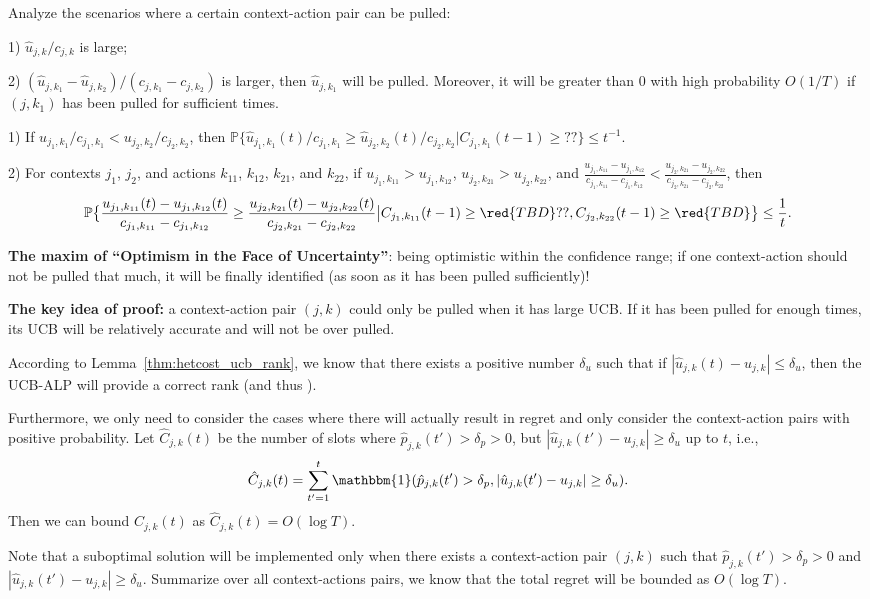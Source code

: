 Analyze the scenarios where a certain context-action pair can be pulled:

1) $\hat{u}_{j,k}/c_{j,k}$ is large;

2) $(\hat{u}_{j,k_1} - \hat{u}_{j,k_2})/(c_{j, k_1} - c_{j, k_2})$ is larger, then $\hat{u}_{j,k_1}$ will be pulled. Moreover, it will be greater than 0 with high probability $O(1/T)$ if $(j,k_1)$ has been pulled for sufficient times.
\begin{lemma} \label{thm:hetcost_ucb_rank}
1) If $u_{j_1,k_1}/c_{j_1,k_1} <  u_{j_2,k_2}/c_{j_2,k_2}$, then $\mathbb{P}\{\hat{u}_{j_1,k_1}(t)/c_{j_1,k_1} \geq   \hat{u}_{j_2,k_2}(t)/c_{j_2,k_2}| C_{j_1, k_1}(t-1) \geq ?? \} \leq t^{-1}$.

2) For contexts $j_1$, $j_2$, and actions $k_{11}$, $k_{12}$, $k_{21}$, and $k_{22}$, if $u_{j_1,k_{11}} > u_{j_1,k_{12}}$, $u_{j_2,k_{21}} > u_{j_2,k_{22}}$, and $\frac{u_{j_1,k_{11}} - u_{j_1,k_{12}}}{c_{j_1,k_{11}} - c_{j_1,k_{12}}} <  \frac{u_{j_2,k_{21}} - u_{j_2,k_{22}}}{c_{j_2,k_{21}} - c_{j_2,k_{22}}}$, then
\begin{equation}
\mathbb{P}\big\{ \frac{u_{j_1,k_{11}}(t) - u_{j_1,k_{12}}(t)}{c_{j_1,k_{11}} - c_{j_1,k_{12}}} \geq  \frac{u_{j_2,k_{21}}(t) - u_{j_2,k_{22}}(t)}{c_{j_2,k_{21}} - c_{j_2,k_{22}}} \big| C_{j_1, k_{11}}(t-1) \geq \red{TBD} ?? , C_{j_2, k_{22}}(t-1) \geq  \red{TBD}\big\} \leq \frac{1}{t}.
\end{equation}
\end{lemma}

\textbf{The maxim of ``Optimism in the Face of Uncertainty''}: being optimistic within the confidence range; if one context-action should not be pulled that much, it will be finally identified (as soon as it has been pulled sufficiently)!

\textbf{The key idea of proof:} a context-action pair $(j,k)$ could only be pulled when it has large UCB. If it has been pulled for enough times, its UCB will be relatively accurate and will not be over pulled.

According to Lemma~\ref{thm:hetcost_ucb_rank}, we know that there exists a positive number $\delta_u$ such that if $|\hat{u}_{j,k}(t) - u_{j,k}| \leq \delta_u$, then the UCB-ALP will provide a correct rank (and thus ). 

Furthermore, we only need to consider the cases where there will actually result in regret and only consider  the context-action pairs with positive probability.
Let $\hat{C}_{j,k}(t)$ be the number of slots where $\hat{p}_{j,k}(t') > \delta_p > 0$, but $|\hat{u}_{j,k}(t') - u_{j,k}| \geq \delta_u$ up to $t$, i.e.,
\begin{equation}
\hat{C}_{j,k}(t) = \sum_{t' = 1}^{t}\mathbbm{1}(\hat{p}_{j,k}(t') > \delta_p, |\hat{u}_{j,k}(t') - u_{j,k}| \geq \delta_u).
\end{equation}
Then we can bound $\hat{C}_{j,k}(t)$ as $\hat{C}_{j,k}(t)  = O(\log T)$. 

Note that a suboptimal solution will be implemented only when there exists a context-action pair $(j,k)$ such that $\hat{p}_{j,k}(t') > \delta_p > 0$ and $|\hat{u}_{j,k}(t') - u_{j,k}| \geq \delta_u$. Summarize over all context-actions pairs, we know that the total regret will be bounded as $O(\log T)$. 
